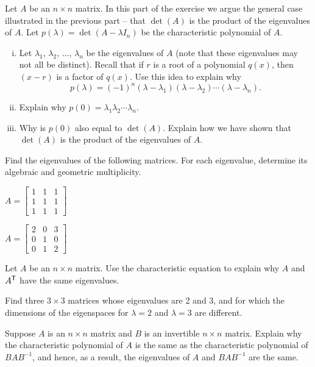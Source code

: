 	\item Let $A$ be an $n \times n$ matrix. In this part of the exercise we argue the general case illustrated in the previous part -- that $\det(A)$ is the product of the eigenvalues of $A$. Let $p(\lambda) = \det(A - \lambda I_n)$ be the characteristic polynomial of $A$.
		\begin{enumerate}[i.]
		\item Let $\lambda_1$, $\lambda_2$, $\ldots$, $\lambda_n$ be the eigenvalues of $A$ (note that these eigenvalues may not all be distinct). Recall that if $r$ is a root of a polynomial $q(x)$, then $(x-r)$ is a factor of $q(x)$. Use this idea to explain why 
	\[p(\lambda) = (-1)^{n} (\lambda-\lambda_1)(\lambda- \lambda_2) \cdots (\lambda - \lambda_n).\]
		\item Explain why $p(0) = \lambda_1 \lambda_2 \cdots \lambda_n$. 
		\item Why is $p(0)$ also equal to $\det(A)$. Explain how we have shown that $\det(A)$ is the product of the eigenvalues of $A$. 
		\end{enumerate}
	\ea


	
\item Find the eigenvalues of the following matrices. For each eigenvalue, determine its algebraic and geometric multiplicity.

\ba
\item $A=\left[ \begin{array}{ccc} 1&1&1\\1&1&1\\1&1&1\end{array} \right]$

\item $A=\left[ \begin{array}{ccc} 2&0&3\\0&1&0\\0&1&2\end{array} \right]$
\ea

\item Let $A$ be an $n \times n$ matrix. Use the characteristic equation to explain why $A$ and $A^{\mathsf{T}}$ have the same eigenvalues.

\item Find three $3 \times 3$ matrices whose eigenvalues are 2 and 3, and for which the dimensions of the eigenspaces for $\lambda=2$ and $\lambda=3$ are different. 

\item Suppose $A$ is an $n\times n$ matrix and $B$ is an invertible $n\times n$ matrix. Explain why the characteristic polynomial of $A$ is the same as the characteristic polynomial of $BAB^{-1}$, and hence, as a result, the eigenvalues of $A$ and $BAB^{-1}$ are the same.

